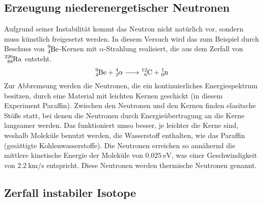 \subsection{Erzeugung niederenergetischer Neutronen}

Aufgrund seiner Instabilität kommt das Neutron nicht natürlich vor, sondern muss künstlich freigesetzt werden.
In diesem Versuch wird das zum Beispiel durch Beschuss von $\ce{^{9}_4Be}$-Kernen mit $\alpha$-Strahlung realisiert, die aus dem Zerfall von $\ce{^{226}_88Ra}$ entsteht.
\begin{equation}
  \ce{^{9}_4Be + ^{4}_2\text{\alpha} -> ^{12}_6C + ^{1}_0n}
\end{equation}
Zur Abbremsung werden die Neutronen, die ein kontinuierliches Energiespektrum besitzen, durch eine Material mit leichten Kernen geschickt (in diesem Experiment Paraffin).
Zwischen den Neutronen und den Kernen finden elasitsche Stöße statt, bei denen die Neutronen durch Energieübertragung an die Kerne langsamer werden.
Das funktioniert umso besser, je leichter die Kerne sind, weshalb Moleküle benutzt werden, die Wasserstoff enthalten, wie das Paraffin (gesättigte Kohlenwasserstoffe).
Die Neutronen erreichen so annähernd die mittlere kinetische Energie der Moleküle von $\SI{0.025}{\eV}$, was einer Geschwindigkeit von $\SI{2.2}{\kilo\meter\per\second}$ entspricht.
Diese Neutronen werden thermische Neutronen genannt. \cite{V702}

\subsection{Zerfall instabiler Isotope}

